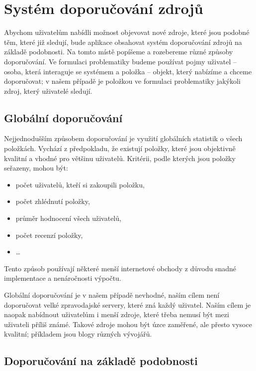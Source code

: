 \chapter{Systém doporučování zdrojů}

Abychom uživatelům nabídli možnost objevovat nové zdroje, které jsou podobné těm, které již sledují, bude aplikace obsahovat systém doporučování zdrojů na základě podobnosti.
Na tomto místě popíšeme a rozebereme různé způsoby doporučování.
Ve formulaci problematiky budeme používat pojmy uživatel -- osoba, která interaguje se systémem a položka -- objekt, který nabízíme a chceme doporučovat; v našem případě je položkou ve formulaci problematiky jakýkoli zdroj, který uživatelé sledují.

\section{Globální doporučování}

Nejjednodušším způsobem doporučování je využití globálních statistik o všech položkách.
Vychází z předpokladu, že existují položky, které jsou objektivně kvalitní a vhodné pro většinu uživatelů.
Kritérii, podle kterých jsou položky seřazeny, mohou být:
\begin{itemize}
    \item počet uživatelů, kteří si zakoupili položku,
    \item počet zhlédnutí položky,
    \item průměr hodnocení všech uživatelů,
	\item počet recenzí položky,
    \item \ldots
\end{itemize}
Tento způsob používají některé menší internetové obchody z důvodu snadné implementace a nenáročnosti výpočtu.

Globální doporučování je v našem případě nevhodné, naším cílem není doporučovat velké zpravodajské servery, které zná každý uživatel.
Naším cílem je naopak nabídnout uživatelům i menší zdroje, které třeba nemusí být mezi uživateli příliš známé.
Takové zdroje mohou být úzce zaměřené, ale přesto vysoce kvalitní; příkladem jsou blogy různých vývojářů.

\section{Doporučování na základě podobnosti}

